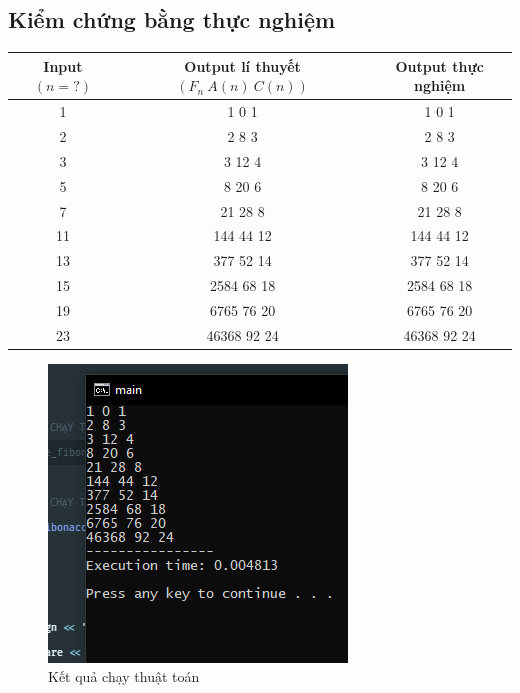 \documentclass[12pt]{article}
\begin{document}
\subsection{Kiểm chứng bằng thực nghiệm}
\begin{center}
\centering
\begin{tabular}{c|c|c}
    Input $(n = ?)$ & Output lí thuyết $(F_n\ A(n)\ C(n))$ & Output thực nghiệm \\
    \hline 
    1 & 1 0 1 & 1 0 1 \\ 
    2 & 2 8 3 & 2 8 3 \\
    3 & 3 12 4 & 3 12 4 \\
    5 & 8 20 6 & 8 20 6 \\
    7 & 21 28 8 & 21 28 8 \\
    11 & 144 44 12 & 144 44 12 \\
    13 & 377 52 14 & 377 52 14 \\
    15 & 2584 68 18 & 2584 68 18 \\
    19 & 6765 76 20 & 6765 76 20 \\
    23 & 46368 92 24 & 46368 92 24
\end{tabular}
\end{center}

\begin{figure}[H]
\centering
\includegraphics[]{result-khu-de-quy.PNG}
\caption{Kết quả chạy thuật toán}
\end{figure}

\printbibliography
\end{document}
